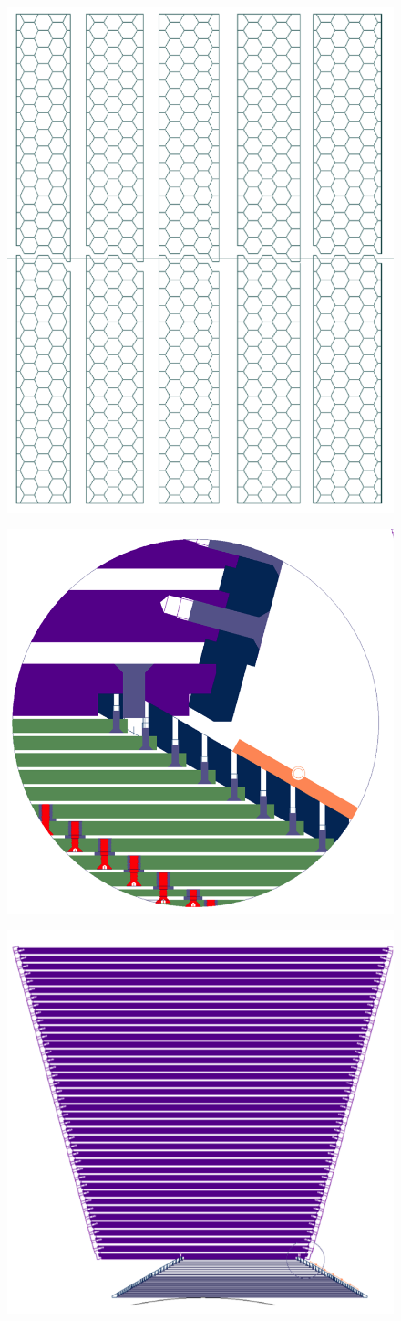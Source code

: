 \begin{figure}
\includegraphics[width=.5\linewidth]{Calorimeter/SiliconTungstenSiD/siliconLayout}
\caption{}
\label{fig:Calorimeter:SiDECAL:siliconLayout}
\end{figure}
\begin{figure}
\includegraphics[width=.5\linewidth]{Calorimeter/SiliconTungstenSiD/edgeFasteners} \hfil
\caption{}
\label{fig:Calorimeter:SiDECAL:edgeFasteners}
\end{figure}
\begin{figure}
\includegraphics[width=.5\linewidth]{Calorimeter/SiliconTungstenSiD/ecalMounting}
\caption{}
\label{fig:Calorimeter:SiDECAL:ecalMounting}
\end{figure}
